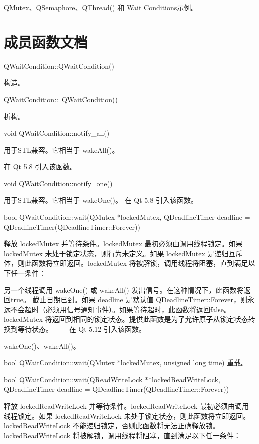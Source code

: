 \begin{notice}[另请参阅]
QMutex、QSemaphore、QThread() 和 Wait Conditions示例。
\end{notice}


\section{成员函数文档}

QWaitCondition::QWaitCondition()

构造。

QWaitCondition::~QWaitCondition()

析构。

void QWaitCondition::notify\_all()

用于STL兼容。它相当于 wakeAll()。

在 Qt 5.8 引入该函数。

void QWaitCondition::notify\_one()

用于STL兼容。它相当于 wakeOne()。
在 Qt 5.8 引入该函数。

bool QWaitCondition::wait(QMutex *lockedMutex, QDeadlineTimer deadline = QDeadlineTimer(QDeadlineTimer::Forever))

释放 lockedMutex 并等待条件。lockedMutex 最初必须由调用线程锁定。如果 lockedMutex 未处于锁定状态，则行为未定义。如果 lockedMutex 是递归互斥体，则此函数将立即返回。lockedMutex 将被解锁，调用线程将阻塞，直到满足以下任一条件：

另一个线程调用 wakeOne() 或 wakeAll() 发出信号。在这种情况下，此函数将返回true。
截止日期已到。如果 deadline 是默认值 QDeadlineTimer::Forever，则永远不会超时（必须用信号通知事件）。如果等待超时，此函数将返回false。
lockedMutex 将返回到相同的锁定状态。提供此函数是为了允许原子从锁定状态转换到等待状态。   在 Qt 5.12 引入该函数。

\begin{notice}[另请参阅]
 wakeOne()、wakeAll()。
\end{notice}



bool QWaitCondition::wait(QMutex *lockedMutex, unsigned long time)
重载。

bool QWaitCondition::wait(QReadWriteLock **lockedReadWriteLock, QDeadlineTimer deadline = QDeadlineTimer(QDeadlineTimer::Forever))

释放 lockedReadWriteLock 并等待条件。lockedReadWriteLock 最初必须由调用线程锁定。如果 lockedReadWriteLock 未处于锁定状态，则此函数将立即返回。 lockedReadWriteLock 不能递归锁定，否则此函数将无法正确释放锁。lockedReadWriteLock 将被解锁，调用线程将阻塞，直到满足以下任一条件：

